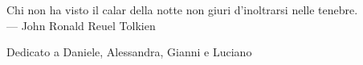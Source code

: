 
\cleardoublepage
{}
\thispagestyle{empty}

\vspace*{3cm}

\begin{center}
Chi non ha visto il calar della notte non giuri d'inoltrarsi nelle tenebre. \\ \medskip
--- John Ronald Reuel Tolkien    
\end{center}

\medskip

\begin{center}
Dedicato a Daniele, Alessandra, Gianni e Luciano
\end{center}
